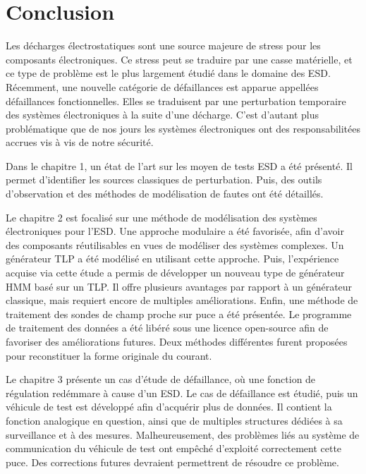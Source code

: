 \chapter{Conclusion}

Les décharges électrostatiques sont une source majeure de stress pour les composants électroniques.
Ce stress peut se traduire par une casse matérielle, et ce type de problème est le plus largement étudié dans le domaine des ESD.
Récemment, une nouvelle catégorie de défaillances est apparue appellées défaillances fonctionnelles.
Elles se traduisent par une perturbation temporaire des systèmes électroniques à la suite d'une décharge.
C'est d'autant plus problématique que de nos jours les systèmes électroniques ont des responsabilitées accrues vis à vis de notre sécurité.

Dans le chapitre 1, un état de l'art sur les moyen de tests ESD a été présenté.
Il permet d'identifier les sources classiques de perturbation.
Puis, des outils d'observation et des méthodes de modélisation de fautes ont été détaillés.

Le chapitre 2 est focalisé sur une méthode de modélisation des systèmes électroniques pour l'ESD.
Une approche modulaire a été favorisée, afin d'avoir des composants réutilisables en vues de modéliser des systèmes complexes.
Un générateur TLP a été modélisé en utilisant cette approche.
Puis, l'expérience acquise via cette étude a permis de développer un nouveau type de générateur HMM basé sur un TLP.
Il offre plusieurs avantages par rapport à un générateur classique, mais requiert encore de multiples améliorations.
Enfin, une méthode de traitement des sondes de champ proche sur puce a été présentée.
Le programme de traitement des données a été libéré \cite{} sous une licence open-source afin de favoriser des améliorations futures.
Deux méthodes différentes furent proposées pour reconstituer la forme originale du courant.

Le chapitre 3 présente un cas d'étude de défaillance, où une fonction de régulation redémmare à cause d'un ESD.
Le cas de défaillance est étudié, puis un véhicule de test est développé afin d'acquérir plus de données.
Il contient la fonction analogique en question, ainsi que de multiples structures dédiées à sa surveillance et à des mesures.
Malheureusement, des problèmes liés au système de communication du véhicule de test ont empêché d'exploité correctement cette puce.
Des corrections futures devraient permettrent de résoudre ce problème.


